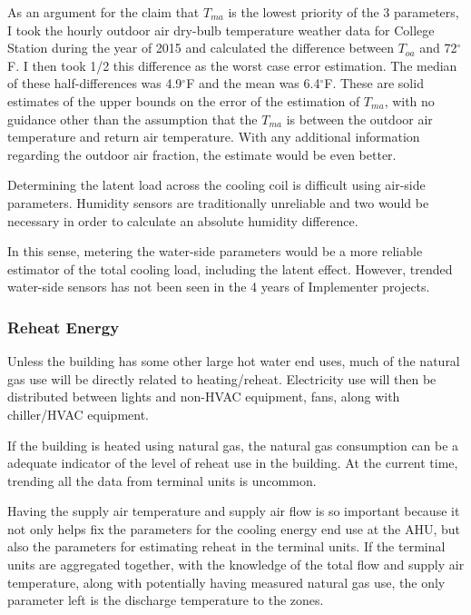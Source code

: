 As an argument for the claim that \(T_{ma}\) is the lowest priority of the 3 parameters, I took the hourly outdoor air dry-bulb temperature weather data for College Station during the year of 2015 and calculated the difference between \(T_{oa}\) and 72\(^\circ\)F. I then took 1/2 this difference as the worst case error estimation. The median of these half-differences was 4.9\(^\circ\)F and the mean was 6.4\(^\circ\)F. These are solid estimates of the upper bounds on the error of the estimation of \(T_{ma}\), with no guidance other than the assumption that the \(T_{ma}\) is between the outdoor air temperature and return air temperature. With any additional information regarding the outdoor air fraction, the estimate would be even better. 

Determining the latent load across the cooling coil is difficult using air-side parameters. Humidity sensors are traditionally unreliable and two would be necessary in order to calculate an absolute humidity difference.

In this sense, metering the water-side parameters would be a more reliable estimator of the total cooling load, including the latent effect. However, trended water-side sensors has not been seen in the 4 years of Implementer projects.

\subsubsection{Reheat Energy}

Unless the building has some other large hot water end uses, much of the natural gas use will be directly related to heating/reheat. Electricity use will then be distributed between lights and non-HVAC equipment, fans, along with chiller/HVAC equipment. 

If the building is heated using natural gas, the natural gas consumption can be a adequate indicator of the level of reheat use in the building. At the current time, trending all the data from terminal units is uncommon. 

Having the supply air temperature and supply air flow is so important because it not only helps fix the parameters for the cooling energy end use at the AHU, but also the parameters for estimating reheat in the terminal units. If the terminal units are aggregated together, with the knowledge of the total flow and supply air temperature, along with potentially having measured natural gas use, the only parameter left is the discharge temperature to the zones. 

